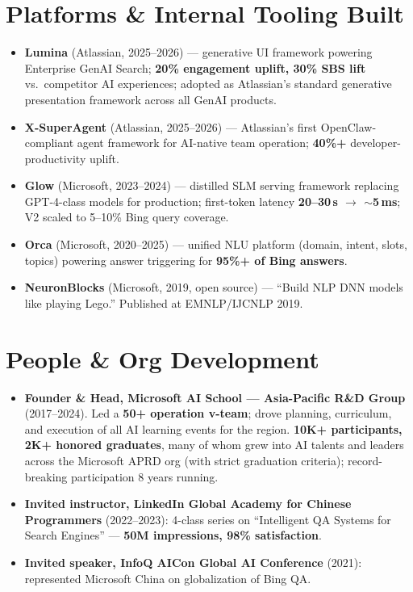 \documentclass[10.5pt,letterpaper]{article}
\begin{document}
\section*{Platforms \& Internal Tooling Built}
\begin{itemize}
  \item \textbf{Lumina} (Atlassian, 2025--2026) --- generative UI framework powering Enterprise GenAI Search; \textbf{20\% engagement uplift, 30\% SBS lift} vs.\ competitor AI experiences; adopted as Atlassian's standard generative presentation framework across all GenAI products.
  \item \textbf{X-SuperAgent} (Atlassian, 2025--2026) --- Atlassian's first OpenClaw-compliant agent framework for AI-native team operation; \textbf{40\%+} developer-productivity uplift.
  \item \textbf{Glow} (Microsoft, 2023--2024) --- distilled SLM serving framework replacing GPT-4-class models for production; first-token latency \textbf{20--30\,s $\to$ $\sim$5\,ms}; V2 scaled to 5--10\% Bing query coverage.
  \item \textbf{Orca} (Microsoft, 2020--2025) --- unified NLU platform (domain, intent, slots, topics) powering answer triggering for \textbf{95\%+ of Bing answers}.
  \item \textbf{NeuronBlocks} (Microsoft, 2019, open source) --- ``Build NLP DNN models like playing Lego.'' Published at EMNLP/IJCNLP 2019.
\end{itemize}

\section*{People \& Org Development}
\begin{itemize}
  \item \textbf{Founder \& Head, Microsoft AI School --- Asia-Pacific R\&D Group} (2017--2024). Led a \textbf{50+ operation v-team}; drove planning, curriculum, and execution of all AI learning events for the region. \textbf{10K+ participants, 2K+ honored graduates}, many of whom grew into AI talents and leaders across the Microsoft APRD org (with strict graduation criteria); record-breaking participation 8 years running.
  \item \textbf{Invited instructor, LinkedIn Global Academy for Chinese Programmers} (2022--2023): 4-class series on ``Intelligent QA Systems for Search Engines'' — \textbf{50M impressions, 98\% satisfaction}.
  \item \textbf{Invited speaker, InfoQ AICon Global AI Conference} (2021): represented Microsoft China on globalization of Bing QA.
\end{itemize}
\end{document}
